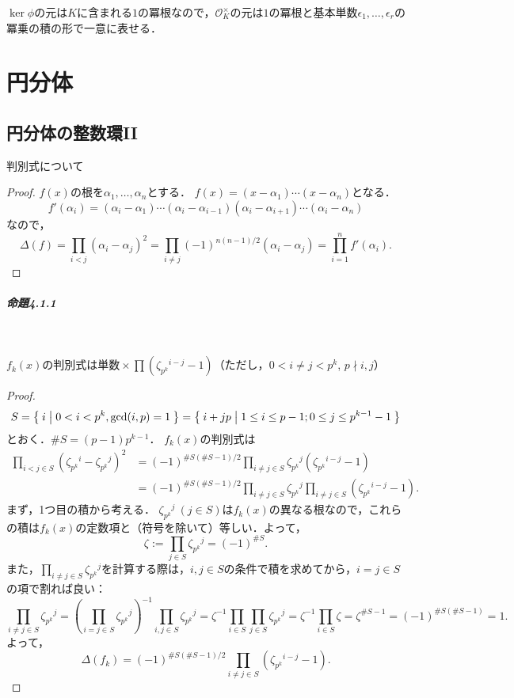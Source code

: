$\ker\phi$の元は$K$に含まれる$1$の冪根なので，$\mathcal{O}_K^\times$の元は$1$の冪根と基本単数$\epsilon_1,\ldots,\epsilon_r$の冪乗の積の形で一意に表せる．

\chapter{円分体}
\section{円分体の整数環II}
\begin{screen}
  \begin{lem}
    \label{disc_diff}
    判別式について
  \end{lem}
\end{screen}
\begin{proof}
  $f(x)$の根を$\alpha_1,\ldots,\alpha_n$とする．
  $f(x)=(x-\alpha_1)\cdots(x-\alpha_n)$となる．
  \[f'(\alpha_i)=(\alpha_i-\alpha_1)\cdots(\alpha_i-\alpha_{i-1})(\alpha_i-\alpha_{i+1})\cdots(\alpha_i-\alpha_n)\]
  なので，
  \[\varDelta(f)=\prod_{i< j}(\alpha_i-\alpha_j)^2=\prod_{i\neq j}(-1)^{n(n-1)/2}(\alpha_i-\alpha_j)=\prod_{i=1}^nf'(\alpha_i).\]
\end{proof}

\paragraph{命題4.1.1}~
\begin{screen}
  $f_k(x)$の判別式は$\text{単数} \times \prod (\zeta_{p^k}{}^{i-j} - 1)$（ただし，$0 < i \neq j < p^k$, $p \nmid i, j$）
\end{screen}
\begin{proof}
  \[S=\Set{i | 0< i< p^k, \gcd(i,p)=1 } = \Set{i+jp | 1\leq i\leq p-1; 0\leq j\leq p^{k-1}-1}\]
  とおく．$\#S=(p-1)p^{k-1}$．
  $f_k(x)$の判別式は
  \begin{align*}
    \prod_{i< j\in S}\left(\zeta_{p^k}{}^i-\zeta_{p^k}{}^j\right)^2 &= (-1)^{\#S(\#S-1)/2}\prod_{i\neq j\in S}\zeta_{p^k}{}^j\left(\zeta_{p^k}{}^{i-j}-1\right) \\
    &= (-1)^{\#S(\#S-1)/2}\prod_{i\neq j\in S}\zeta_{p^k}{}^j\prod_{i\neq j\in S}\left(\zeta_{p^k}{}^{i-j}-1\right).
  \end{align*}
  まず，1つ目の積から考える．
  $\zeta_{p^k}{}^j\ (j\in S)$は$f_k(x)$の異なる根なので，これらの積は$f_k(x)$の定数項と（符号を除いて）等しい．よって，
  \[\zeta:=\prod_{j\in S}\zeta_{p^k}{}^j=(-1)^{\#S}.\]
  また，$\prod_{i\neq j\in S}\zeta_{p^k}{}^j$を計算する際は，$i,j\in S$の条件で積を求めてから，$i=j\in S$の項で割れば良い：
  \[\prod_{i\neq j\in S}\zeta_{p^k}{}^j=\left(\prod_{i=j\in S}\zeta_{p^k}{}^j\right)^{-1}\prod_{i,j\in S}\zeta_{p^k}{}^j=\zeta^{-1}\prod_{i\in S}\prod_{j\in S}\zeta_{p^k}{}^j=\zeta^{-1}\prod_{i\in S}\zeta=\zeta^{\#S-1}=(-1)^{\#S(\#S -1)}=1.\]
  よって，
  \[\varDelta(f_k)=(-1)^{\#S(\#S-1)/2}\prod_{i\neq j\in S}\left(\zeta_{p^k}{}^{i-j}-1\right).\]
\end{proof}

